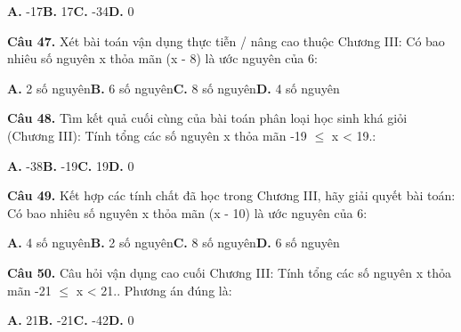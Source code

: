 \documentclass[11pt,a4paper]{article}
\begin{document}
\hspace*{1.5em}\textbf{A.} -17\quad\quad \textbf{B.} 17\quad\quad \textbf{C.} -34\quad\quad \textbf{D.} 0\par\vspace{2pt}
\textbf{\color{primary} Câu 47.} Xét bài toán vận dụng thực tiễn / nâng cao thuộc Chương III: Có bao nhiêu số nguyên x thỏa mãn (x - 8) là ước nguyên của 6:\par
\hspace*{1.5em}\textbf{A.} 2 số nguyên\quad\quad \textbf{B.} 6 số nguyên\quad\quad \textbf{C.} 8 số nguyên\quad\quad \textbf{D.} 4 số nguyên\par\vspace{2pt}
\textbf{\color{primary} Câu 48.} Tìm kết quả cuối cùng của bài toán phân loại học sinh khá giỏi (Chương III): Tính tổng các số nguyên x thỏa mãn -19 $\le$ x < 19.:\par
\hspace*{1.5em}\textbf{A.} -38\quad\quad \textbf{B.} -19\quad\quad \textbf{C.} 19\quad\quad \textbf{D.} 0\par\vspace{2pt}
\textbf{\color{primary} Câu 49.} Kết hợp các tính chất đã học trong Chương III, hãy giải quyết bài toán: Có bao nhiêu số nguyên x thỏa mãn (x - 10) là ước nguyên của 6:\par
\hspace*{1.5em}\textbf{A.} 4 số nguyên\quad\quad \textbf{B.} 2 số nguyên\quad\quad \textbf{C.} 8 số nguyên\quad\quad \textbf{D.} 6 số nguyên\par\vspace{2pt}
\textbf{\color{primary} Câu 50.} Câu hỏi vận dụng cao cuối Chương III: Tính tổng các số nguyên x thỏa mãn -21 $\le$ x < 21.. Phương án đúng là:\par
\hspace*{1.5em}\textbf{A.} 21\quad\quad \textbf{B.} -21\quad\quad \textbf{C.} -42\quad\quad \textbf{D.} 0\par\vspace{2pt}
\end{document}
